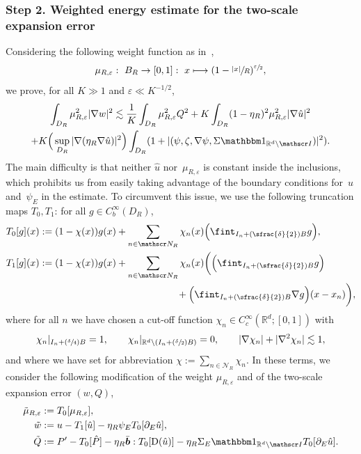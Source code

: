 \documentclass[JEP,XML,SOM,Unicode,published]{cedram}
\let\mathcal\mathscr
\newcommand\mto{\mathchoice{\longmapsto}{\mapsto}{\mapsto}{\mapsto}}
\newcommand{\Psfrac}[2]{(\sfrac{#1}{#2})}
\let\mathds\mathbbm
\theoremstyle{plain}
\theoremstyle{definition}
\newcommand{\e}{\varepsilon}
\newcommand{\R}{\mathbb R}
\newcommand{\Ic}{\mathcal I}
\newcommand{\Nc}{\mathcal N}
\newcommand{\D}{\operatorname{D}}
\newcommand{\bb}{\bar{\boldsymbol b}}
\newcommand{\step}[1]{\subsubsection*{Step #1}}
\begin{document}
\step{2. Weighted energy estimate for the two-scale expansion error}
Considering the following weight function as in~\cite{GNO-reg},
\begin{equation}\label{eq:def-muReps}
\mu_{R,\e}:~B_R \to [0,1]:~ x\mto(1-\sfrac{|x|}{R})^{\sfrac\e2},
\end{equation}
we prove, for all $K\gg1$ and $\e\ll K^{-1/2}$,
\begin{multline}\label{e.p1.8}
\int_{D_R} \mu_{R,\e}^2|\nabla w|^2
\lesssim \frac1K\int_{D_R}\mu_{R,\e}^2Q^2+K\int_{D_R}(1-\eta_R)^2\mu_{R,\e}^2|\nabla\hat u|^2\\
+K\Big(\sup_{D_R}|\nabla(\eta_R\nabla\hat u)|^2\Big)\int_{D_R}(1+|(\psi,\zeta,\nabla\psi,\Sigma\mathds1_{\R^d\setminus\Ic})|^2).
\end{multline}
The main difficulty is that neither $\hat u$ nor~$\mu_{R,\e}$ is constant inside the inclusions, which prohibits us from easily taking advantage of the boundary conditions for~$u$ and~$\psi_E$ in the estimate.
To circumvent this issue, we use the following truncation maps $T_0,T_1$: for all $g\in C^\infty_b(D_R)$,
\begin{equation}\label{eq:def-T0T1}
\begin{aligned}
T_0[g](x)&:= (1-\chi(x))g(x)+\sum_{n\in\Nc_R}\chi_n(x)\Big(\fint_{I_n+\Psfrac\delta2 B}g\Big),\\
T_1[g](x)&:= (1-\chi(x))g(x)+\sum_{n\in\Nc_R}\chi_n(x)\bigg(\Big(\fint_{I_n+\Psfrac\delta2 B}g\Big)\\
&\hspace*{5cm}+\Big(\fint_{I_n+\Psfrac\delta2 B}\nabla g\Big)(x-x_n)\bigg),
\end{aligned}
\end{equation}
where for all $n$ we have chosen a cut-off function $\chi_n\in C^\infty_c(\R^d;[0,1])$ with
\[\chi_n|_{I_n+\Psfrac\delta4B}= 1, \qquad\chi_n|_{\R^d\setminus(I_n+\Psfrac\delta2 B)}=0,\qquad|\nabla \chi_n|+|\nabla^2\chi_n|\lesssim 1,\]
and where we have set for abbreviation $\chi:=\sum_{n\in\Nc_R}\chi_n$.
In these terms,
we consider the following modification of the weight $\mu_{R,\e}$ and of the two-scale expansion error $(w,Q)$,
\begin{equation}\label{eq:trunc-wQ}
\begin{aligned}
\tilde \mu_{R,\e}&:= T_0[\mu_{R,\e}],\\
\tilde w&:= u-T_1[\hat u]-\eta_R\psi_ET_0[\partial_E\hat u],\\
\tilde Q&:= P'-T_0[\hat P]-\eta_R\bb:T_0[\D(\hat u)]-\eta_R\Sigma_E\mathds1_{\R^d\setminus\Ic}T_0[\partial_E\hat u].
\end{aligned}
\end{equation}
\end{document}
